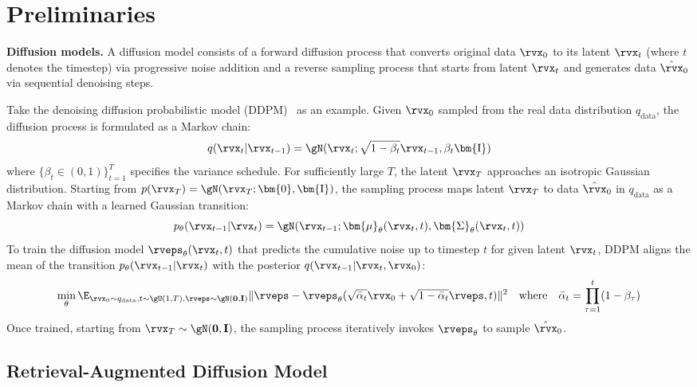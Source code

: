 \section{Preliminaries}

{\bf Diffusion models.} A diffusion model consists of a forward diffusion process that converts original data $\rvx_0$ to its latent $\rvx_t$ (where $t$ denotes the timestep) via progressive noise addition and a reverse sampling process that starts from latent $\rvx_t$ and generates data $\hat{\rvx}_0$ via sequential denoising steps. 

Take the denoising diffusion probabilistic model (DDPM)~\citep{ho2020denoising} as an example. Given $\rvx_0$ sampled from the real data distribution $q_\mathrm{data}$, the diffusion process is formulated as a Markov chain: 
\begin{equation}
q(\rvx_t | \rvx_{t-1}) = \gN(\rvx_t ; \sqrt{1 - \beta_t}\rvx_{t-1}, \beta_t \bm{\text{I}}) 
\end{equation}
where $\{\beta_t\in (0,1)\}_{t=1}^T$ specifies the variance schedule. For sufficiently large $T$, the latent $\rvx_T$ approaches an isotropic Gaussian distribution. Starting from $p(\rvx_T) = \gN(\rvx_T; \bm{0}, \bm{\text{I}})$, the sampling process maps latent $\rvx_T$ to data $\hat{\rvx}_0$ in $q_\mathrm{data}$ as a Markov chain with a learned Gaussian transition:
\begin{equation}
p_\theta(\rvx_{t-1} | \rvx_t) = \gN( \rvx_{t-1}; \bm{\mu}_\theta(\rvx_t, t), \bm{\Sigma}_\theta(\rvx_t, t)) 
\end{equation}
To train the diffusion model $\rveps_\theta(\rvx_t, t)$ that predicts the cumulative noise up to timestep $t$ for given latent $\rvx_t$, DDPM aligns the mean of the transition $p_\theta(\rvx_{t-1} | \rvx_t)$ with the posterior $q(\rvx_{t-1}| \rvx_t, \rvx_0)$: 
\begin{equation}
\label{eq:mean-align}
\min_\theta \E_{\rvx_0 \sim q_\mathrm{data}, t \sim \gU(1, T), \rveps \sim \gN(\mathbf{0},  \mathbf{I})} \| \rveps - \rveps_\theta(\sqrt{\bar{\alpha}_t} \rvx_0 + \sqrt{1-\bar{\alpha}_t}\rveps, t)  \|^2  \nonumber  \quad \text{where} \quad  \bar{\alpha}_t = \prod_{\tau=1}^t (1  - \beta_\tau)
\end{equation}
Once trained, starting from $\rvx_T \sim \gN(\mathbf{0}, \mathbf{I})$, the sampling process iteratively invokes $\rveps_\theta$ to sample $\hat{\rvx}_0$.



\subsection{Retrieval-Augmented Diffusion Model}

